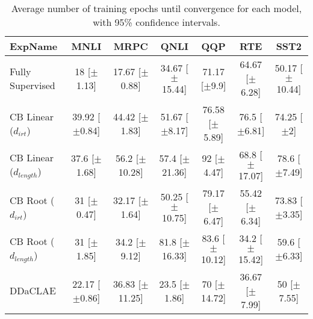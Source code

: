 \begin{table*}[ht]
\centering
\begingroup\small
\begin{tabular}{lcccccc}
  \hline
ExpName & MNLI & MRPC & QNLI & QQP & RTE & SST2 \\ 
  \hline
Fully Supervised & 18 [$\pm$1.13] & 17.67 [$\pm$0.88] & 34.67 [$\pm$15.44] & 71.17 [$\pm$9.9] & 64.67 [$\pm$6.28] & 50.17 [$\pm$10.44] \\ 
  CB Linear ($d_{irt}$) & 39.92 [$\pm$0.84] & 44.42 [$\pm$1.83] & 51.67 [$\pm$8.17] & 76.58 [$\pm$5.89] & 76.5 [$\pm$6.81] & 74.25 [$\pm$2] \\ 
  CB Linear ($d_{length}$) & 37.6 [$\pm$1.68] & 56.2 [$\pm$10.28] & 57.4 [$\pm$21.36] & 92 [$\pm$4.47] & 68.8 [$\pm$17.07] & 78.6 [$\pm$7.49] \\ 
  CB Root ($d_{irt}$) & 31 [$\pm$0.47] & 32.17 [$\pm$1.64] & 50.25 [$\pm$10.75] & 79.17 [$\pm$6.47] & 55.42 [$\pm$6.34] & 73.83 [$\pm$3.35] \\ 
  CB Root ($d_{length}$) & 31 [$\pm$1.85] & 34.2 [$\pm$9.12] & 81.8 [$\pm$16.33] & 83.6 [$\pm$10.12] & 34.2 [$\pm$15.42] & 59.6 [$\pm$6.33] \\ 
  DDaCLAE & 22.17 [$\pm$0.86] & 36.83 [$\pm$11.25] & 23.5 [$\pm$1.86] & 70 [$\pm$14.72] & 36.67 [$\pm$7.99] & 50 [$\pm$7.55] \\ 
   \hline
\end{tabular}
\endgroup
\caption{Average number of training epochs until convergence for each model, with 95\% confidence intervals.} 
\label{tab:epoch_lstm-False}
\end{table*}
